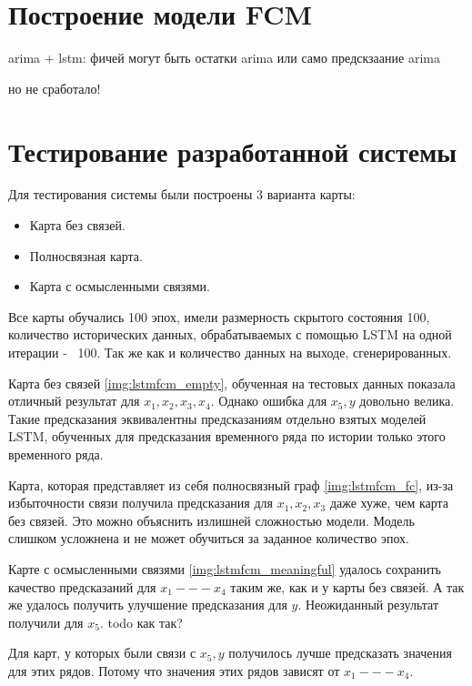 \section{Построение модели FCM}

arima + lstm:
фичей могут быть остатки arima
или само предскзаание arima

но не сработало!

\section{Тестирование разработанной системы}

Для тестирования системы были построены 3 варианта карты:
\begin{itemize}
	\item Карта без связей.
	\item Полносвязная карта.
	\item Карта с осмысленными связями.
\end{itemize}


Все карты обучались 100 эпох, имели размерность скрытого состояния 100,
количество исторических данных, обрабатываемых с помощью LSTM на одной итерации -~ 100.
Так же как и количество данных на выходе, сгенерированных.


Карта без связей \ref{img:lstmfcm_empty}, обученная на тестовых данных
показала отличный результат для $ x_1, x_2, x_3, x_4  $. Однако ошибка
для $ x_5, y $ довольно велика. Такие предсказания эквивалентны предсказаниям
отдельно взятых моделей LSTM, обученных для предсказания временного ряда
по истории только этого временного ряда.

Карта, которая представляет из себя полносвязный граф \ref{img:lstmfcm_fc},
из-за избыточности связи получила предсказания для $ x_1, x_2, x_3 $ даже
хуже, чем карта без связей. Это можно объяснить излишней сложностью модели.
Модель слишком усложнена и не может обучиться за заданное количество эпох.

Карте с осмысленными связями \ref{img:lstmfcm_meaningful} удалось сохранить качество
предсказаний для $ x_1 --- x_4 $ таким же, как и у карты без связей.
А так же удалось получить улучшение предсказания для $ y $.
Неожиданный результат получили для $ x_5 $. todo как так?

Для карт, у которых были связи с $ x_5, y $ получилось лучше предсказать значения
для этих рядов. Потому что значения этих рядов зависят от $ x_1 --- x_4 $.

